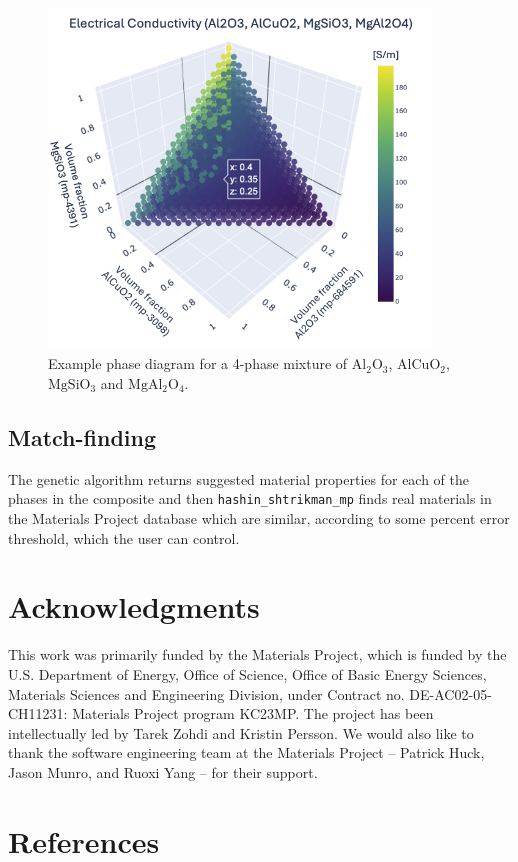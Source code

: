 \begin{figure}
\centering
\includegraphics[width=4in,height=\textheight,keepaspectratio]{figures/elec-cond-4phase-clean.png}
\caption{Example phase diagram for a 4-phase mixture of
\(\mathrm{Al_2O_3}\), \(\mathrm{AlCuO_2}\), \(\mathrm{MgSiO_3}\) and
\(\mathrm{MgAl_2O_4}\). \label{fig:4phase}}
\end{figure}

\subsection{Match-finding}\label{match-finding}

The genetic algorithm returns suggested material properties for each of
the phases in the composite and then \texttt{hashin\_shtrikman\_mp}
finds real materials in the Materials Project database which are
similar, according to some percent error threshold, which the user can
control.

\section{Acknowledgments}\label{acknowledgments}

This work was primarily funded by the Materials Project, which is funded
by the U.S. Department of Energy, Office of Science, Office of Basic
Energy Sciences, Materials Sciences and Engineering Division, under
Contract no. DE-AC02-05-CH11231: Materials Project program KC23MP. The
project has been intellectually led by Tarek Zohdi and Kristin Persson.
We would also like to thank the software engineering team at the
Materials Project -- Patrick Huck, Jason Munro, and Ruoxi Yang -- for
their support.

\section{References}\label{references}
